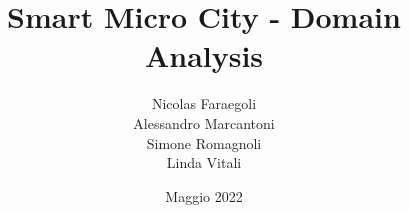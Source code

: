 \title{Smart Micro City - Domain Analysis}
\author{Nicolas Faraegoli\\
Alessandro Marcantoni\\
Simone Romagnoli\\
Linda Vitali}
\date{Maggio 2022}
